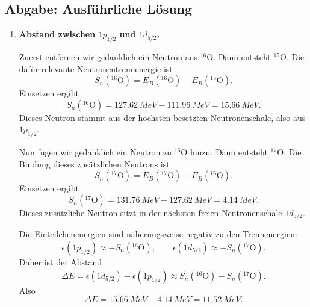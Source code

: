 \documentclass[11pt,a4paper]{scrartcl}
\newcommand{\isotope}[2]{^{#1}\mathrm{#2}}
\theoremstyle{definition}
\theoremstyle{plain}
\theoremstyle{remark}
\begin{document}
\subsection{Abgabe: Ausf\"uhrliche L\"osung}

\begin{enumerate}[label=(\alph*)]
    \item \textbf{Abstand zwischen $1p_{1/2}$ und $1d_{5/2}$.}

    \begin{calculationbox}
        Zuerst entfernen wir gedanklich ein Neutron aus $\isotope{16}{O}$. Dann entsteht $\isotope{15}{O}$. Die daf\"ur relevante Neutronentrennenergie ist
        \[
            S_n(\isotope{16}{O})
            =E_B(\isotope{16}{O})-E_B(\isotope{15}{O}).
        \]
        Einsetzen ergibt
        \[
            S_n(\isotope{16}{O})
            =\SI{127.62}{MeV}-\SI{111.96}{MeV}
            =\SI{15.66}{MeV}.
        \]
        Dieses Neutron stammt aus der h\"ochsten besetzten Neutronenschale, also aus $1p_{1/2}$.
    \end{calculationbox}

    \begin{calculationbox}
        Nun f\"ugen wir gedanklich ein Neutron zu $\isotope{16}{O}$ hinzu. Dann entsteht $\isotope{17}{O}$. Die Bindung dieses zus\"atzlichen Neutrons ist
        \[
            S_n(\isotope{17}{O})
            =E_B(\isotope{17}{O})-E_B(\isotope{16}{O}).
        \]
        Einsetzen ergibt
        \[
            S_n(\isotope{17}{O})
            =\SI{131.76}{MeV}-\SI{127.62}{MeV}
            =\SI{4.14}{MeV}.
        \]
        Dieses zus\"atzliche Neutron sitzt in der n\"achsten freien Neutronenschale $1d_{5/2}$.
    \end{calculationbox}

    \begin{calculationbox}[title=Schalenabstand]
        Die Einteilchenenergien sind n\"aherungsweise negativ zu den Trennenergien:
        \[
            \epsilon(1p_{1/2})\approx -S_n(\isotope{16}{O}),
            \qquad
            \epsilon(1d_{5/2})\approx -S_n(\isotope{17}{O}).
        \]
        Daher ist der Abstand
        \[
            \Delta E
            =\epsilon(1d_{5/2})-\epsilon(1p_{1/2})
            \approx S_n(\isotope{16}{O})-S_n(\isotope{17}{O}).
        \]
        Also
        \[
            \Delta E
            =\SI{15.66}{MeV}-\SI{4.14}{MeV}
            =\SI{11.52}{MeV}.
        \]
    \end{calculationbox}


\end{enumerate}
\end{document}
